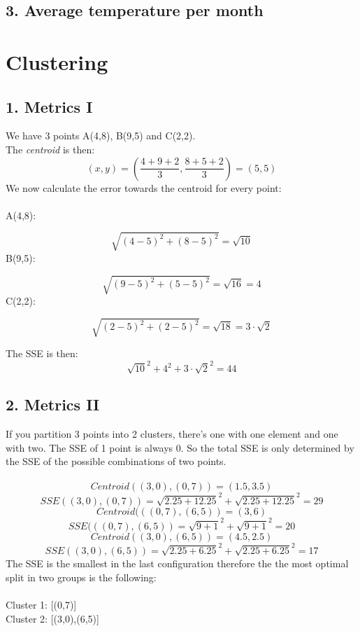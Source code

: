 \documentclass[11pt,a4paper,oneside]{article}
\begin{document}
\subsection*{3. Average temperature per month}


\pagebreak
\section*{Clustering}
\subsection*{1. Metrics I}
We have 3 points A(4,8), B(9,5) and C(2,2).\\
The \textit{centroid} is then:
$$ (x,y) = \left(\frac{4+9+2}{3},\frac{8+5+2}{3}\right)= (5,5)$$
We now calculate the error towards the centroid for every point:\\
\\
A(4,8):

$$\sqrt{(4-5)^2 + (8-5)^2} = \sqrt{10}$$
\noindent
B(9,5):

$$\sqrt{(9-5)^2 + (5-5)^2} = \sqrt{16} = 4$$
\noindent
C(2,2):

$$\sqrt{(2-5)^2 + (2-5)^2} = \sqrt{18} = 3\cdot\sqrt{2}$$

\noindent
The SSE is then:
$$\sqrt{10}^2 + 4^2 + 3\cdot\sqrt{2}^2 = 44$$

\subsection*{2. Metrics II}
If you partition 3 points into 2 clusters, there's one with one element and one with two.
The SSE of 1 point is always 0. So the total SSE is only determined by the SSE of the possible combinations of two points.
\\
\\
$$Centroid((3,0),(0,7))=(1.5,3.5)$$
$$SSE((3,0),(0,7))=\sqrt{2.25+12.25}^2 + \sqrt{2.25+12.25}^2 = 29$$
$$Centroid(((0,7),(6,5))=(3,6)$$
$$SSE(((0,7),(6,5))=\sqrt{9+1}^2 + \sqrt{9+1}^2 = 20$$
$$Centroid((3,0),(6,5))=(4.5,2.5)$$
$$SSE((3,0),(6,5))=\sqrt{2.25+6.25}^2 + \sqrt{2.25+6.25}^2 = 17$$
\noindent
The SSE is the smallest in the last configuration therefore the the most optimal split in two groups is the following:
\\
\\
Cluster 1: [(0,7)]\\
Cluster 2: [(3,0),(6,5)]
\end{document}
